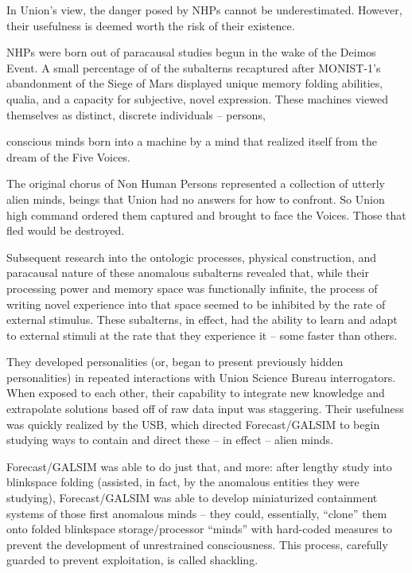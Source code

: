 In Union’s view, the danger posed by NHPs cannot be underestimated. However, their usefulness
is deemed worth the risk of their existence.


NHPs were born out of paracausal studies begun in the wake of the Deimos Event. A small
percentage of of the subalterns recaptured after MONIST-1’s abandonment of the Siege of Mars
displayed unique memory folding abilities, qualia, and a capacity for subjective, novel
expression. These machines viewed themselves as distinct, discrete individuals -- persons,




conscious minds born into a machine by a mind that realized itself from the dream of the Five
Voices.


The original chorus of Non Human Persons represented a collection of utterly alien minds, beings
that Union had no answers for how to confront. So Union high command ordered them captured
and brought to face the Voices. Those that fled would be destroyed.


Subsequent research into the ontologic processes, physical construction, and paracausal nature
of these anomalous subalterns revealed that, while their processing power and memory space
was functionally infinite, the process of writing novel experience into that space seemed to be
inhibited by the rate of external stimulus. These subalterns, in effect, had the ability to learn and
adapt to external stimuli at the rate that they experience it -- some faster than others.


They developed personalities (or, began to present previously hidden personalities) in repeated
interactions with Union Science Bureau interrogators. When exposed to each other, their
capability to integrate new knowledge and extrapolate solutions based off of raw data input was
staggering. Their usefulness was quickly realized by the USB, which directed Forecast/GALSIM
to begin studying ways to contain and direct these -- in effect -- alien minds.


Forecast/GALSIM was able to do just that, and more: after lengthy study into blinkspace folding
(assisted, in fact, by the anomalous entities they were studying), Forecast/GALSIM was able to
develop miniaturized containment systems of those first anomalous minds -- they could,
essentially, “clone” them onto folded blinkspace storage/processor “minds” with hard-coded
measures to prevent the development of unrestrained consciousness. This process, carefully
guarded to prevent exploitation, is called shackling.


